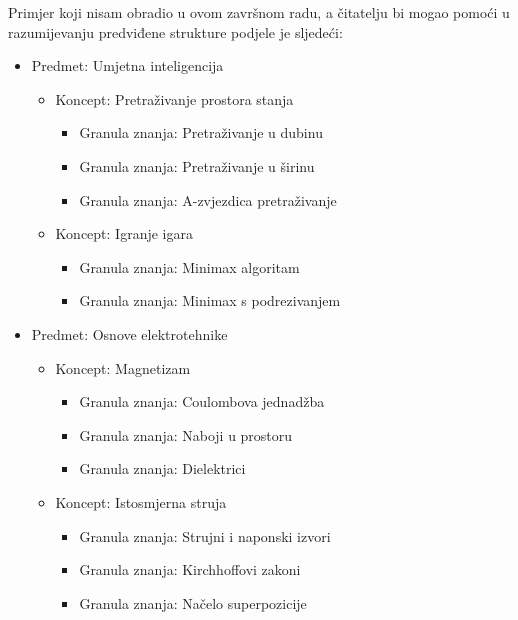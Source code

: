 \documentclass[times, utf8, zavrsni, numeric]{fer}
\begin{document}
\par
Primjer koji nisam obradio u ovom završnom radu, a čitatelju bi mogao pomoći u razumijevanju predviđene strukture podjele je sljedeći:
\begin{itemize}
	\item Predmet: Umjetna inteligencija
	\begin{itemize}
		\item Koncept: Pretraživanje prostora stanja
		\begin{itemize}
			\item Granula znanja: Pretraživanje u dubinu
			\item Granula znanja: Pretraživanje u širinu
			\item Granula znanja: A-zvjezdica pretraživanje
		\end{itemize}
		\item Koncept: Igranje igara
		\begin{itemize}
			\item Granula znanja: Minimax algoritam
			\item Granula znanja: Minimax s podrezivanjem
		\end{itemize}
	\end{itemize}
	\item Predmet: Osnove elektrotehnike
	\begin{itemize}
		\item Koncept: Magnetizam
		\begin{itemize}
			\item Granula znanja: Coulombova jednadžba
			\item Granula znanja: Naboji u prostoru
			\item Granula znanja: Dielektrici
		\end{itemize}
		\item Koncept: Istosmjerna struja
		\begin{itemize}
			\item Granula znanja: Strujni i naponski izvori
			\item Granula znanja: Kirchhoffovi zakoni
			\item Granula znanja: Načelo superpozicije
		\end{itemize}
	\end{itemize}
\end{itemize}
\end{document}
